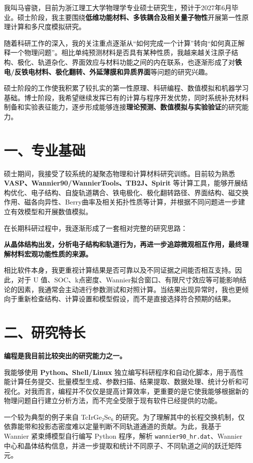 我叫马睿骁，目前为浙江理工大学物理学专业硕士研究生，预计于2027年6月毕业。硕士阶段，我主要围绕\textbf{低维功能材料、多铁耦合及相关量子物性}开展第一性原理计算和多尺度模拟研究。

随着科研工作的深入，我的关注重点逐渐从“如何完成一个计算”转向“如何真正解释一个物理问题”。相比单纯预测材料是否具有某种性质，我越来越关注原子结构、极化、轨道杂化、界面效应与材料功能之间的内在联系，也逐渐形成了对\textbf{铁电/反铁电材料、极化翻转、外延薄膜和异质界面}等问题的研究兴趣。

硕士阶段的工作使我积累了较扎实的第一性原理、科研编程、数值模拟和机器学习基础。博士阶段，我希望继续发挥已有的计算与程序开发优势，同时系统补充材料制备和实验表征能力，逐步形成能够连接\textbf{理论预测、数值模拟与实验验证}的研究能力。

\section{一、专业基础}

硕士期间，我接受了较系统的凝聚态物理和计算材料研究训练。目前较为熟悉 \textbf{VASP、Wannier90/WannierTools、TB2J、Spirit} 等计算工具，能够开展结构优化、电子结构、自旋轨道耦合、铁电极化、极化翻转路径、界面结构、磁交换作用、磁各向异性、Berry曲率及相关拓扑性质等计算，并根据不同问题进一步建立有效模型和开展数值模拟。

在长期科研过程中，我逐渐形成了一套相对完整的研究思路：

\textbf{从晶体结构出发，分析电子结构和轨道行为，再进一步追踪微观相互作用，最终理解材料宏观功能性质的来源。}

相比软件本身，我更重视计算结果是否可靠以及不同证据之间能否相互支持。因此，对于 U 值、SOC、k点密度、Wannier拟合窗口、有限尺寸效应等可能影响结论的因素，我通常会主动进行参数测试和对照计算。当结果出现异常时，我也更倾向于重新检查结构、计算设置和模型假设，而不是直接选择符合预期的结果。

\section{二、研究特长}

\textbf{编程是我目前比较突出的研究能力之一。}

我能够使用 \textbf{Python、Shell/Linux} 独立编写科研程序和自动化脚本，用于高性能计算任务提交、批量模型生成、参数扫描、结果提取、数据处理、统计分析和可视化。对我而言，编程并不仅仅是提高计算效率，更重要的是它使我能够根据新的物理问题自行建立分析方法，而不完全受限于现有软件已经提供的功能。

一个较为典型的例子来自 TcIrGe₂Se₆ 的研究。为了理解其中的长程交换机制，仅依靠能带和投影态密度难以定量判断不同轨道通道的贡献。为此，我基于 Wannier 紧束缚模型自行编写 Python 程序，解析 \texttt{wannier90\_hr.dat}、Wannier中心和晶体结构信息，并进一步提取和统计不同原子、不同轨道之间的跃迁矩阵元。


